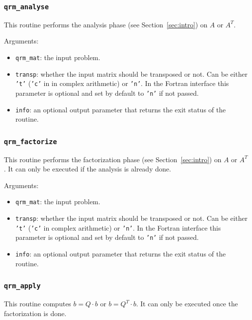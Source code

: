 \documentclass[11pt]{article}
\begin{document}
\subsubsection{\texttt{qrm\_analyse}}
This routine performs the analysis phase (see Section~\ref{sec:intro})
on $A$ or $A^T$.


\noindent Arguments:
\begin{itemize}
\item \texttt{qrm\_mat}: the input problem.
\item \texttt{transp}: whether the input matrix should be transposed
  or not. Can be either \texttt{'t'} (\texttt{'c'} in
  in complex arithmetic) or \texttt{'n'}. In the Fortran
  interface this parameter is optional and set by default to
  \texttt{'n'} if not passed.
\item \texttt{info}: an optional output parameter that returns the
  exit status of the routine.
\end{itemize}


\subsubsection{\texttt{qrm\_factorize}}
This routine performs the factorization phase (see Section~\ref{sec:intro})
on $A$ or $A^T$. It can only be executed if the analysis is already done.


\noindent Arguments:
\begin{itemize}
\item \texttt{qrm\_mat}: the input problem.
\item \texttt{transp}: whether the input matrix should be transposed
  or not. Can be either \texttt{'t'} (\texttt{'c'} in complex
  arithmetic) or \texttt{'n'}. In the Fortran interface this parameter
  is optional and set by default to \texttt{'n'} if not passed.
\item \texttt{info}: an optional output parameter that returns the
  exit status of the routine.
\end{itemize}

\subsubsection{\texttt{qrm\_apply}}
This routine computes $b=Q\cdot b$ or $b=Q^T\cdot b$. It can only be
executed once the factorization is done.
\end{document}
